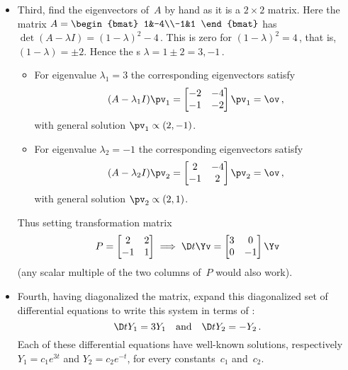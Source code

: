 \begin{itemize}
\item Third, find the eigenvectors of~\(A\) by hand as it is a \(2\times2\) matrix. 
Here the matrix \(A=\begin{bmat} 1&-4\\-1&1 \end{bmat}\) has  \(\det(A-\lambda I)=(1-\lambda)^2-4\)\,.
This is zero for \((1-\lambda)^2=4\)\,, that is, \((1-\lambda)=\pm2\).
Hence the s \(\lambda=1\pm2=3,-1\)\,.
\begin{itemize}
\item For eigenvalue \(\lambda_1=3\) the corresponding eigenvectors satisfy
\begin{equation*}
(A-\lambda_1I)\pv_1=\begin{bmatrix} -2&-4\\-1&-2 \end{bmatrix}\pv_1=\ov\,,
\end{equation*}
with general solution \(\pv_1\propto(2,-1)\).

\item For eigenvalue \(\lambda_2=-1\) the corresponding eigenvectors satisfy
\begin{equation*}
(A-\lambda_2I)\pv_2=\begin{bmatrix} 2&-4\\-1&2 \end{bmatrix}\pv_2=\ov\,,
\end{equation*}
with general solution \(\pv_2\propto(2,1)\).
\end{itemize}
Thus setting transformation matrix 
\begin{equation*}
P=\begin{bmatrix} 2&2\\-1&1 \end{bmatrix}
\implies \D t\Yv=\begin{bmatrix} 3&0\\0&-1 \end{bmatrix}\Yv
\end{equation*}
(any scalar multiple of the two columns of~\(P\) would also work).

\item Fourth, having diagonalized the matrix, expand this diagonalized set of differential equations to write this system in terms of : 
\begin{equation*}
\D t{Y_1}=3Y_1 \quad\text{and}\quad \D t{Y_2}=-Y_2\,.
\end{equation*}
Each of these differential equations have well-known  solutions, respectively \(Y_1=c_1e^{3t}\) and \(Y_2=c_2e^{-t}\),  for every constants~\(c_1\) and~\(c_2\).


\end{itemize}
